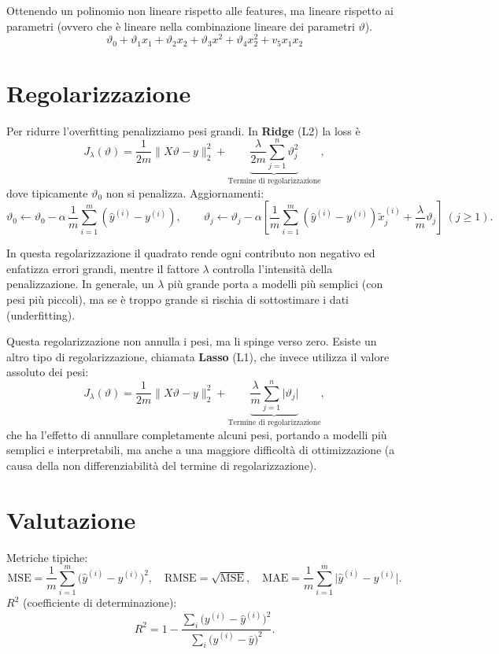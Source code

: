 Ottenendo un polinomio non lineare rispetto alle features, ma lineare rispetto ai parametri (ovvero che è lineare nella combinazione lineare dei parametri $\vartheta$).
$$
\vartheta_0 + \vartheta_{1}x_1 + \vartheta_{2}x_2 + \vartheta_{3}x^2 + \vartheta_{4}x_2^2 + v_5x_1x_2
$$

\section{Regolarizzazione}
Per ridurre l'overfitting penalizziamo pesi grandi. In \textbf{Ridge} (L2) la loss è
\[
J_\lambda(\vartheta)=\frac{1}{2m}\|X\vartheta-y\|_2^2 + \underbrace{\frac{\lambda}{2m} \sum_{j=1}^{n}\vartheta_j^2}_{\text{Termine di regolarizzazione}},
\]
dove tipicamente \(\vartheta_0\) non si penalizza. Aggiornamenti:
\[
\vartheta_0\leftarrow \vartheta_0-\alpha\,\frac{1}{m}\sum_{i=1}^m(\hat y^{(i)}-y^{(i)}),\qquad
\vartheta_j\leftarrow \vartheta_j-\alpha\left[\frac{1}{m}\sum_{i=1}^m(\hat y^{(i)}-y^{(i)})\tilde x^{(i)}_j+\frac{\lambda}{m}\vartheta_j\right]\ (j\ge 1).
\]

In questa regolarizzazione il quadrato rende ogni contributo non negativo ed enfatizza errori grandi, mentre il fattore \(\lambda\) controlla l'intensità della penalizzazione. In generale, un \(\lambda\) più grande porta a modelli più semplici (con pesi più piccoli), ma se è troppo grande si rischia di sottostimare i dati (underfitting).

Questa regolarizzazione non annulla i pesi, ma li spinge verso zero. Esiste un altro tipo di regolarizzazione, chiamata \textbf{Lasso} (L1), che invece utilizza il valore assoluto dei pesi:
\[
J_\lambda(\vartheta)=\frac{1}{2m}\|X\vartheta-y\|_2^2 + \underbrace{\frac{\lambda}{m} \sum_{j=1}^{n}\lvert\vartheta_j\rvert}_{\text{Termine di regolarizzazione}},
\]
che ha l'effetto di annullare completamente alcuni pesi, portando a modelli più semplici e interpretabili, ma anche a una maggiore difficoltà di ottimizzazione (a causa della non differenziabilità del termine di regolarizzazione).


\section{Valutazione}
Metriche tipiche:
\[
\text{MSE}=\frac{1}{m}\sum_{i=1}^m\!\big(\hat y^{(i)}-y^{(i)}\big)^2,\quad
\text{RMSE}=\sqrt{\text{MSE}},\quad
\text{MAE}=\frac{1}{m}\sum_{i=1}^m\!\lvert \hat y^{(i)}-y^{(i)}\rvert.
\]
\noindent
\textbf{\(R^2\)} (coefficiente di determinazione):
\[
R^2=1-\frac{\sum_i\big(y^{(i)}-\hat{y}^{(i)}\big)^2}{\sum_i\big(y^{(i)}-\bar{y}\big)^2}.
\]

